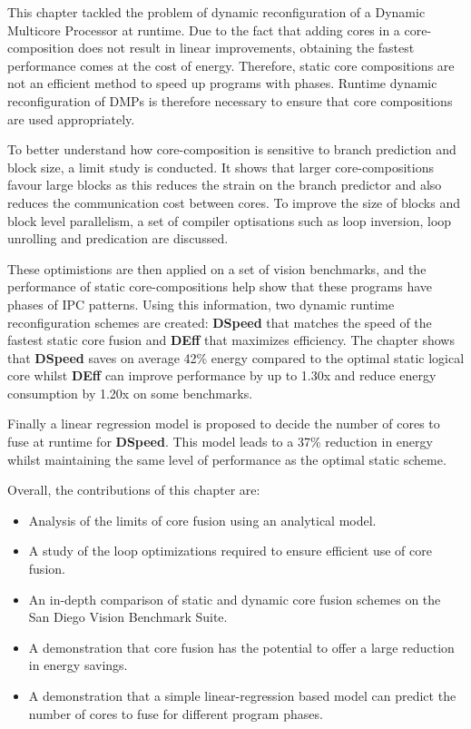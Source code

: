 This chapter tackled the problem of dynamic reconfiguration of a Dynamic Multicore Processor at runtime.
Due to the fact that adding cores in a core-composition does not result in linear improvements, obtaining the fastest performance comes at the cost of energy.
Therefore, static core compositions are not an efficient method to speed up programs with phases.
Runtime dynamic reconfiguration of DMPs is therefore necessary to ensure that core compositions are used appropriately.

To better understand how core-composition is sensitive to branch prediction and block size, a limit study is conducted.
It shows that larger core-compositions favour large blocks as this reduces the strain on the branch predictor and also reduces the communication cost between cores.
To improve the size of blocks and block level parallelism, a set of compiler optisations such as loop inversion, loop unrolling and predication are discussed.

These optimistions are then applied on a set of vision benchmarks, and the performance of static core-compositions help show that these programs have phases of IPC patterns.
Using this information, two dynamic runtime reconfiguration schemes are created:  \textbf{DSpeed} that matches the speed of the fastest static core fusion and \textbf{DEff} that maximizes efficiency.
The chapter shows that \textbf{DSpeed} saves on average 42\% energy compared to the optimal static logical core whilst \textbf{DEff} can improve performance by up to 1.30x and reduce energy consumption by 1.20x on some benchmarks.

Finally a linear regression model is proposed to decide the number of cores to fuse at runtime for \textbf{DSpeed}.
This  model leads to a 37\% reduction in energy whilst maintaining the same level of performance as the optimal static scheme.

Overall, the contributions of this chapter are:

\begin{itemize}
\item Analysis of the limits of core fusion using an analytical model.
\vspace{-1em}
\item A study of the loop optimizations required to ensure efficient use of core fusion.
\vspace{-2.5em}
\item An in-depth comparison of static and dynamic core fusion schemes on the San Diego Vision Benchmark Suite.
\vspace{-1em}
\item A demonstration that core fusion has the potential to offer a large reduction in energy savings.
\vspace{-1em}
\item A demonstration that a simple linear-regression based model can predict the number of cores to fuse for different program phases.
\end{itemize}

